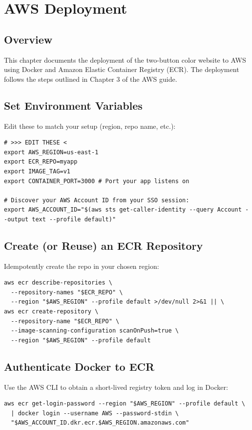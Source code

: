 \chapter{AWS Deployment}
\label{chap:aws}

\section{Overview}
This chapter documents the deployment of the two-button color website to AWS using Docker and Amazon Elastic Container Registry (ECR). The deployment follows the steps outlined in Chapter 3 of the AWS guide.

\section{Set Environment Variables}
Edit these to match your setup (region, repo name, etc.):

\begin{verbatim}
# >>> EDIT THESE <
export AWS_REGION=us-east-1
export ECR_REPO=myapp
export IMAGE_TAG=v1
export CONTAINER_PORT=3000 # Port your app listens on

# Discover your AWS Account ID from your SSO session:
export AWS_ACCOUNT_ID="$(aws sts get-caller-identity --query Account --output text --profile default)"
\end{verbatim}

\section{Create (or Reuse) an ECR Repository}
Idempotently create the repo in your chosen region:

\begin{verbatim}
aws ecr describe-repositories \
  --repository-names "$ECR_REPO" \
  --region "$AWS_REGION" --profile default >/dev/null 2>&1 || \
aws ecr create-repository \
  --repository-name "$ECR_REPO" \
  --image-scanning-configuration scanOnPush=true \
  --region "$AWS_REGION" --profile default
\end{verbatim}

\section{Authenticate Docker to ECR}
Use the AWS CLI to obtain a short-lived registry token and log in Docker:

\begin{verbatim}
aws ecr get-login-password --region "$AWS_REGION" --profile default \
  | docker login --username AWS --password-stdin \
  "$AWS_ACCOUNT_ID.dkr.ecr.$AWS_REGION.amazonaws.com"
\end{verbatim}

